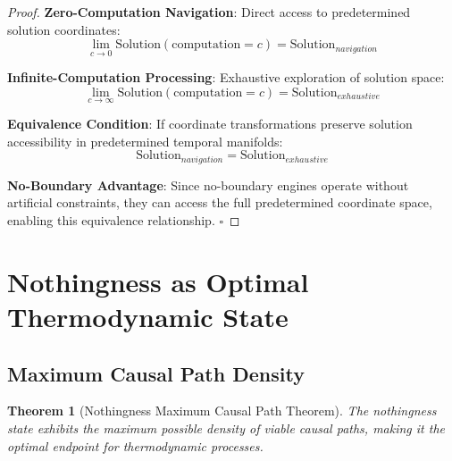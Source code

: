 \documentclass[11pt,a4paper]{article}
\newtheorem{theorem}{Theorem}[section]
\theoremstyle{remark}
\begin{document}
\begin{proof}
\textbf{Zero-Computation Navigation}: Direct access to predetermined solution coordinates:
\begin{equation}
\lim_{c \to 0} \text{Solution}(\text{computation} = c) = \text{Solution}_{navigation}
\end{equation}

\textbf{Infinite-Computation Processing}: Exhaustive exploration of solution space:
\begin{equation}
\lim_{c \to \infty} \text{Solution}(\text{computation} = c) = \text{Solution}_{exhaustive}
\end{equation}

\textbf{Equivalence Condition}: If coordinate transformations preserve solution accessibility in predetermined temporal manifolds:
\begin{equation}
\text{Solution}_{navigation} = \text{Solution}_{exhaustive}
\end{equation}

\textbf{No-Boundary Advantage}: Since no-boundary engines operate without artificial constraints, they can access the full predetermined coordinate space, enabling this equivalence relationship. $\square$
\end{proof}

\section{Nothingness as Optimal Thermodynamic State}

\subsection{Maximum Causal Path Density}

\begin{theorem}[Nothingness Maximum Causal Path Theorem]
The nothingness state exhibits the maximum possible density of viable causal paths, making it the optimal endpoint for thermodynamic processes.
\end{theorem}
\end{document}

